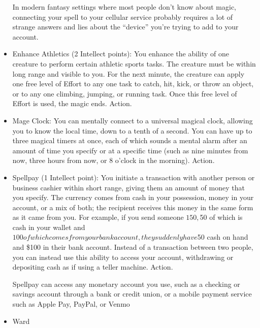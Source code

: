 \begin{multicols}{2}
\begin{itemize}
In modern fantasy settings where most people don’t know about magic, connecting your spell to your cellular service probably requires a lot of strange answers and lies about the “device” you’re trying to add to your account.
\item Enhance Athletics (2 Intellect points): You enhance the ability of one creature to perform certain athletic sports tasks. The creature must be within long range and visible to you. For the next minute, the creature can apply one free level of Effort to any one task to catch, hit, kick, or throw an object, or to any one climbing, jumping, or running task. Once this free level of Effort is used, the magic ends. Action. 
\item Mage Clock: You can mentally connect to a universal magical clock, allowing you to know the local time, down to a tenth of a second. You can have up to three magical timers at once, each of which sounds a mental alarm after an amount of time you specify or at a specific time (such as nine minutes from now, three hours from now, or 8 o’clock in the morning). Action.
\item Spellpay (1 Intellect point): You initiate a transaction with another person or business cashier within short range, giving them an amount of money that you specify. The currency comes from cash in your possession, money in your account, or a mix of both; the recipient receives this money in the same form as it came from you. For example, if you send someone $150, $50 of which is cash in your wallet and $100 of which comes from your bank account, they suddenly have $50 cash on hand and \$100 in their bank account. Instead of a transaction between two people, you can instead use this ability to access your account, withdrawing or depositing cash as if using a teller machine. Action. 

Spellpay can access any monetary account you use, such as a checking or savings account through a bank or credit union, or a mobile payment service such as Apple Pay, PayPal, or Venmo
\item Ward
\end{itemize}


\end{multicols}
